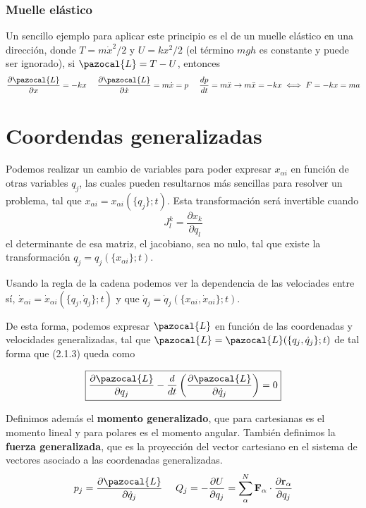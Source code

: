 \subsubsection{Muelle elástico}
Un sencillo ejemplo para aplicar este principio es el de un muelle elástico en una dirección, donde $T=m\dot{x}^2/2$ y $U = kx^2/2$ (el término $mgh$ es constante y puede ser ignorado), si $\pazocal{L} = T-U$, entonces
\[\frac{\partial \pazocal{L}}{\partial x}=-kx \ \ \ \ \frac{\partial \pazocal{L}}{\partial \dot{x}}=m\dot{x} = p \ \ \ \ \frac{d p}{dt} = m\ddot{x} \rightarrow m\ddot{x} = -kx \iff F=-kx=ma\]
\section{Coordendas generalizadas} 
Podemos realizar un cambio de variables para poder expresar $x_{\alpha i}$ en función de otras variables $q_j$, las cuales pueden resultarnos más sencillas para resolver un problema, tal que $x_{\alpha i}=x_{\alpha i}(\{q_j\};t)$. Esta transformación será invertible cuando
\vspace{-10pt}
\[J_l^k=\frac{\partial x_k}{\partial q_l}\]
el determinante de esa matriz, el jacobiano, sea no nulo, tal que existe la transformación $q_j = q_j(\{x_{\alpha i}\};t)$.

Usando la regla de la cadena podemos ver la dependencia de las velociades entre sí, $\dot{x}_{\alpha i}=\dot{x}_{\alpha i}(\{q_j,\dot{q}_j\};t)$ y que $\dot{q}_j = \dot{q}_j(\{x_{\alpha i},\dot{x}_{\alpha i}\};t)$.

De esta forma, podemos expresar $\pazocal{L}$ en función de las coordenadas y velocidades generalizadas, tal que $\pazocal{L}=\pazocal{L}(\{q_j,\dot{q}_j\};t)$ de tal forma que (2.1.3) queda como 

\vspace{-10pt}
\Large\begin{equation} \label{2.2.1}
    \boxed{\frac{\partial \pazocal{L}}{\partial q_j} -\frac{d}{dt}\left(\frac{\partial \pazocal{L}}{\partial \dot{q}_j}\right) =0}
\end{equation} \normalsize

Definimos además el \textbf{momento generalizado}, que para cartesianas es el momento lineal y para polares es el momento angular. También definimos la \textbf{fuerza generalizada}, que es la proyección del vector cartesiano en el sistema de vectores asociado a las coordenadas generalizadas.
\begin{equation} \label{2.2.2}
    p_j = \frac{\partial \pazocal{L}}{\partial \dot{q}_j} \ \ \ \ Q_j = -\frac{\partial U}{\partial q_j}=\sum_\alpha^N{\mathbf{F}_\alpha\cdot \frac{\partial \mathbf{r}_{\alpha}}{\partial q_j}}
\end{equation} 
